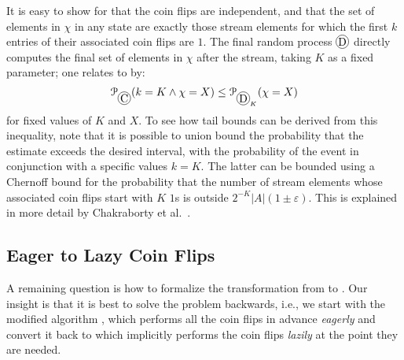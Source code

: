 It is easy to show for  that the coin flips are independent, and that the set of elements in $\chi$ in any state are exactly those stream elements for which the first $k$ entries of their associated coin flips are $1$.
The final random process $\circled{D}$ directly computes the final set of elements in $\chi$ after the stream, taking $K$ as a fixed parameter; one relates  to  by:
\[ \prob_{\circled{C}}(k = K \land \chi = X)  \leq \prob_{\circled{D}_K}(\chi = X)\]
for fixed values of $K$ and $X$.
To see how tail bounds can be derived from this inequality, note that it is possible to union bound the probability that the estimate exceeds the desired interval, with the probability of the event in conjunction with a specific values $k = K$.
The latter can be bounded using a Chernoff bound for the probability that the number of stream elements whose associated coin flips start with $K$ $1$s is outside $2^{-K} |A| (1 \pm \varepsilon)$.
This is explained in more detail by Chakraborty et al.~\cite{chakraborty2023}.

%
\subsection{Eager to Lazy Coin Flips}
A remaining question is how to formalize the transformation from  to .
Our insight is that it is best to solve the problem backwards, i.e., we start with the modified algorithm , which performs all the coin flips in advance \emph{eagerly} and convert it back to  which implicitly performs the coin flips \emph{lazily} at the point they are needed.

